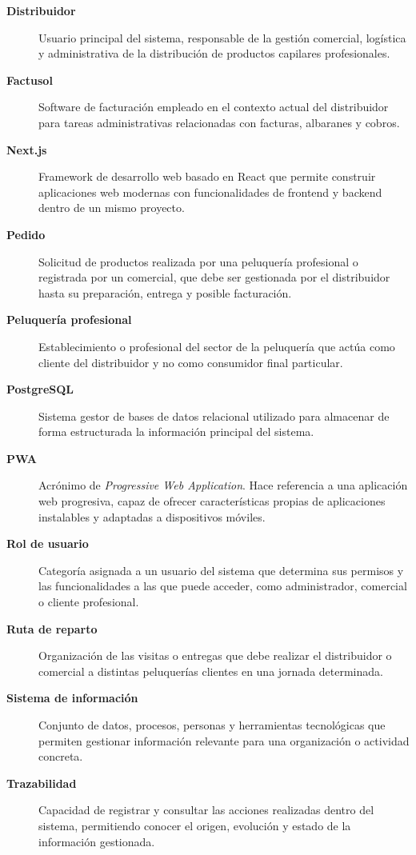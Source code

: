 \begin{description}
\item[\textbf{Distribuidor}]
Usuario principal del sistema, responsable de la gestión comercial, logística y administrativa de la distribución de productos capilares profesionales.

\item[\textbf{Factusol}]
Software de facturación empleado en el contexto actual del distribuidor para tareas administrativas relacionadas con facturas, albaranes y cobros.

\item[\textbf{Next.js}]
Framework de desarrollo web basado en React que permite construir aplicaciones web modernas con funcionalidades de frontend y backend dentro de un mismo proyecto.

\item[\textbf{Pedido}]
Solicitud de productos realizada por una peluquería profesional o registrada por un comercial, que debe ser gestionada por el distribuidor hasta su preparación, entrega y posible facturación.

\item[\textbf{Peluquería profesional}]
Establecimiento o profesional del sector de la peluquería que actúa como cliente del distribuidor y no como consumidor final particular.

\item[\textbf{PostgreSQL}]
Sistema gestor de bases de datos relacional utilizado para almacenar de forma estructurada la información principal del sistema.

\item[\textbf{PWA}]
Acrónimo de \textit{Progressive Web Application}. Hace referencia a una aplicación web progresiva, capaz de ofrecer características propias de aplicaciones instalables y adaptadas a dispositivos móviles.

\item[\textbf{Rol de usuario}]
Categoría asignada a un usuario del sistema que determina sus permisos y las funcionalidades a las que puede acceder, como administrador, comercial o cliente profesional.

\item[\textbf{Ruta de reparto}]
Organización de las visitas o entregas que debe realizar el distribuidor o comercial a distintas peluquerías clientes en una jornada determinada.

\item[\textbf{Sistema de información}]
Conjunto de datos, procesos, personas y herramientas tecnológicas que permiten gestionar información relevante para una organización o actividad concreta.

\item[\textbf{Trazabilidad}]
Capacidad de registrar y consultar las acciones realizadas dentro del sistema, permitiendo conocer el origen, evolución y estado de la información gestionada.

\end{description}
